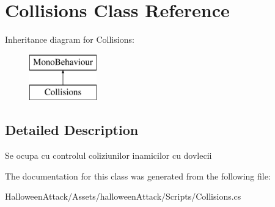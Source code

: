 \hypertarget{class_collisions}{}\section{Collisions Class Reference}
\label{class_collisions}
Inheritance diagram for Collisions\+:\begin{figure}[H]
\begin{center}
\leavevmode
\includegraphics[height=2.000000cm]{class_collisions}
\end{center}
\end{figure}


\subsection{Detailed Description}
Se ocupa cu controlul coliziunilor inamicilor cu dovlecii 

The documentation for this class was generated from the following file\+:\begin{DoxyCompactItemize}
\item 
Halloween\+Attack/\+Assets/halloween\+Attack/\+Scripts/Collisions.\+cs\end{DoxyCompactItemize}
